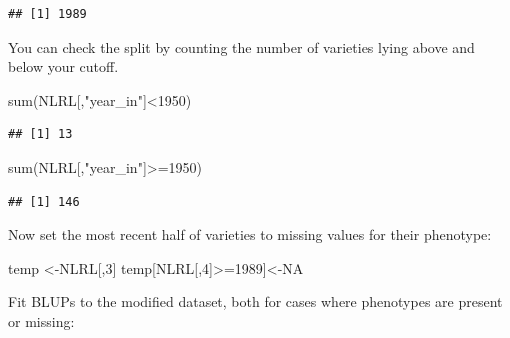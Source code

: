 \documentclass[
]{book}
\newenvironment{Shaded}{\begin{snugshade}}{\end{snugshade}}
\newcommand{\AttributeTok}[1]{\textcolor[rgb]{0.77,0.63,0.00}{#1}}
\newcommand{\ConstantTok}[1]{\textcolor[rgb]{0.00,0.00,0.00}{#1}}
\newcommand{\DecValTok}[1]{\textcolor[rgb]{0.00,0.00,0.81}{#1}}
\newcommand{\FunctionTok}[1]{\textcolor[rgb]{0.00,0.00,0.00}{#1}}
\newcommand{\NormalTok}[1]{#1}
\newcommand{\OtherTok}[1]{\textcolor[rgb]{0.56,0.35,0.01}{#1}}
\newcommand{\SpecialCharTok}[1]{\textcolor[rgb]{0.00,0.00,0.00}{#1}}
\newcommand{\StringTok}[1]{\textcolor[rgb]{0.31,0.60,0.02}{#1}}
\begin{document}
\begin{verbatim}
## [1] 1989
\end{verbatim}

You can check the split by counting the number of varieties lying above and below your cutoff.

\begin{Shaded}
\begin{Highlighting}[]
\FunctionTok{sum}\NormalTok{(NLRL[,}\StringTok{"year\_in"}\NormalTok{]}\SpecialCharTok{\textless{}}\DecValTok{1950}\NormalTok{)}
\end{Highlighting}
\end{Shaded}

\begin{verbatim}
## [1] 13
\end{verbatim}

\begin{Shaded}
\begin{Highlighting}[]
\FunctionTok{sum}\NormalTok{(NLRL[,}\StringTok{"year\_in"}\NormalTok{]}\SpecialCharTok{\textgreater{}=}\DecValTok{1950}\NormalTok{)}
\end{Highlighting}
\end{Shaded}

\begin{verbatim}
## [1] 146
\end{verbatim}

Now set the most recent half of varieties to missing values for their phenotype:

\begin{Shaded}
\begin{Highlighting}[]
\NormalTok{temp }\OtherTok{\textless{}{-}}\NormalTok{NLRL[,}\DecValTok{3}\NormalTok{]}
\NormalTok{temp[NLRL[,}\DecValTok{4}\NormalTok{]}\SpecialCharTok{\textgreater{}=}\DecValTok{1989}\NormalTok{]}\OtherTok{\textless{}{-}}\ConstantTok{NA}
\end{Highlighting}
\end{Shaded}

Fit BLUPs to the modified dataset, both for cases where phenotypes are present or missing:

\begin{Shaded}
\end{Shaded}
\end{document}
